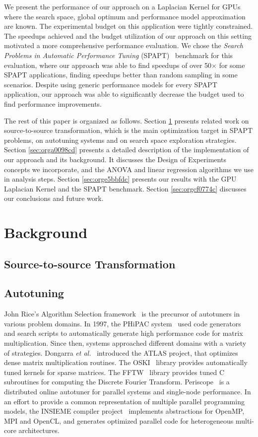 \documentclass[conference]{IEEEtran}
\begin{document}
We present the performance of our approach on a Laplacian Kernel for GPUs where
the search space, global optimum and performance model approximation are known.
The experimental budget on this application were tightly constrained. The
speedups achieved and the budget utilization of our approach on this setting
motivated a more comprehensive performance evaluation. We chose the \emph{Search
Problems in Automatic Performance Tuning}
(SPAPT)~\cite{balaprakash2012spapt} benchmark for this evaluation, where
our approach was able to find speedups of over 50\(\times\) for some SPAPT
applications, finding speedups better than random sampling in some scenarios.
Despite using generic performance models for every SPAPT application, our
approach was able to significantly decrease the budget used to find performance
improvements.

The rest of this paper is organized as follows. Section \ref{sec:orga5af5c0} presents
related work on source-to-source transformation, which is the main optimization
target in SPAPT problems, on autotuning systems and on search space exploration
strategies. Section \ref{sec:orga0098cd} presents a
detailed description of the implementation of our approach and its background.
It discusses the Design of Experiments concepts we incorporate, and the ANOVA
and linear regression algorithms we use in analysis steps. Section \ref{sec:orge5bbfdc} presents our results with the GPU Laplacian Kernel and the SPAPT
benchmark. Section \ref{sec:orgcf0774c} discusses our conclusions and future work.
\section{Background}
\label{sec:orga5af5c0}
\subsection{Source-to-source Transformation}
\label{sec:org661c7ef}
\subsection{Autotuning}
\label{sec:orge79c5dd}
John Rice's Algorithm Selection framework~\cite{rice1976algorithm} is the
precursor of autotuners in various problem domains. In 1997, the PHiPAC
system~\cite{bilmes1997optimizing} used code generators and search scripts
to automatically generate high performance code for matrix multiplication. Since
then, systems approached different domains with a variety of strategies.
Dongarra \emph{et al.}~\cite{dongarra1998automatically} introduced the ATLAS
project, that optimizes dense matrix multiplication routines. The
OSKI~\cite{vuduc2005oski} library provides automatically tuned kernels for
sparse matrices. The FFTW~\cite{frigo1998fftw} library provides tuned C
subroutines for computing the Discrete Fourier Transform.
Periscope~\cite{gerndt2010automatic} is a distributed online autotuner for
parallel systems and single-node performance. In an effort to provide a common
representation of multiple parallel programming models, the INSIEME compiler
project~\cite{jordan2012multi} implements abstractions for OpenMP, MPI and
OpenCL, and generates optimized parallel code for heterogeneous multi-core
architectures.
\end{document}
